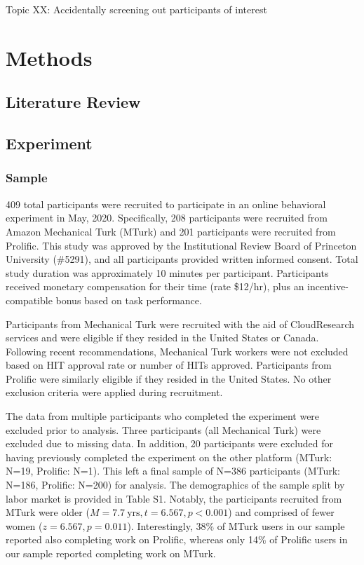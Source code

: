 \documentclass[a4paper,notitlepage,12pt]{article}
\begin{document}
Topic XX: Accidentally screening out participants of interest

\section{Methods}

\subsection{Literature Review}

\subsection{Experiment}

\subsubsection{Sample}

409 total participants were recruited to participate in an online behavioral experiment in May, 2020. Specifically, 208 participants were recruited from Amazon Mechanical Turk (MTurk) and 201 participants were recruited from Prolific.  This study was approved by the Institutional Review Board of Princeton University (\#5291), and all participants provided written informed consent. Total study duration was approximately 10 minutes per participant. Participants received monetary compensation for their time (rate \$12/hr), plus an incentive-compatible bonus based on task performance. 

Participants from Mechanical Turk were recruited with the aid of CloudResearch services and were eligible if they resided in the United States or Canada. Following recent recommendations, Mechanical Turk workers were not excluded based on HIT approval rate or number of HITs approved. Participants from Prolific were similarly eligible if they resided in the United States. No other exclusion criteria were applied during recruitment. 

The data from multiple participants who completed the experiment were excluded prior to analysis. Three participants (all Mechanical Turk) were excluded due to missing data. In addition, 20 participants were excluded for having previously completed the experiment on the other platform (MTurk: N=19, Prolific: N=1). This left a final sample of N=386 participants (MTurk: N=186, Prolific: N=200) for analysis. The demographics of the sample split by labor market is provided in Table S1. Notably, the participants recruited from MTurk were older ($M = 7.7 \ \text{yrs}, t = 6.567, p < 0.001$) and comprised of fewer women ($z = 6.567, p = 0.011$). Interestingly, 38\% of MTurk users in our sample reported also completing work on Prolific, whereas only 14\% of Prolific users in our sample reported completing work on MTurk. 
\end{document}
